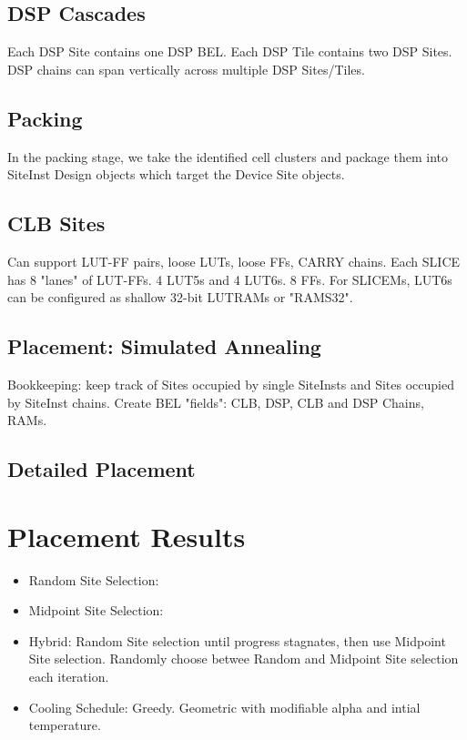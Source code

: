 \documentclass{article}
\begin{document}
\begin{multicols}{2}
        \subsection{DSP Cascades}
            Each DSP Site contains one DSP BEL. 
            Each DSP Tile contains two DSP Sites. 
            DSP chains can span vertically across multiple DSP Sites/Tiles. 


    \subsection{Packing}
        In the packing stage, we take the identified cell clusters and package them into SiteInst Design objects which target the Device Site objects. 
        \subsection{CLB Sites}
            Can support LUT-FF pairs, loose LUTs, loose FFs, CARRY chains. 
            Each SLICE has 8 "lanes" of LUT-FFs. 4 LUT5s and 4 LUT6s. 8 FFs. 
            For SLICEMs, LUT6s can be configured as shallow 32-bit LUTRAMs or "RAMS32". 

    \subsection{Placement: Simulated Annealing} 
        Bookkeeping: keep track of Sites occupied by single SiteInsts and Sites occupied by SiteInst chains. 
        Create BEL "fields": CLB, DSP, CLB and DSP Chains, RAMs. 

        \subsection{Detailed Placement}


\section{Placement Results}
    \begin{itemize}
    \item Random Site Selection:
    \item Midpoint Site Selection:
    \item Hybrid: 
        Random Site selection until progress stagnates, then use Midpoint Site selection. 
        Randomly choose betwee Random and Midpoint Site selection each iteration. 
    \item Cooling Schedule: 
        Greedy. 
        Geometric with modifiable alpha and intial temperature. 
    \end{itemize}


\end{multicols}
\end{document}

